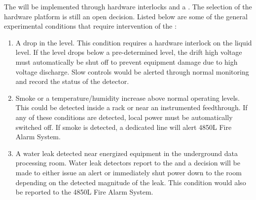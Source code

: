 The  will be implemented through hardware interlocks and a
.  The selection of the  hardware platform is still an open decision.  Listed below are some of the general  experimental conditions that require intervention of the :
\begin{enumerate}
 \item A drop in the  level.  This condition requires a hardware
   interlock on the liquid level.  If the level drops below a
   pre-determined level, the drift high voltage must automatically be 
   shut off to prevent equipment damage due to high voltage discharge.  Slow controls would be
   alerted through normal monitoring and record the status of the detector.
 \item Smoke or a temperature/humidity increase above normal operating
   levels. This could be detected inside a rack or near an instrumented
   feedthrough.  If any of these conditions are detected, local
   power must be automatically switched off. If smoke is detected, a
   dedicated line will alert 4850L Fire Alarm System.
 \item A water leak detected near energized equipment in the 
   underground data processing room.  Water leak detectors 
   report to the   and a decision will be made to either
   issue an alert or immediately shut power down to the room depending
   on the detected magnitude of the leak.  This condition would also be reported
   to the 4850L Fire Alarm System.
\end{enumerate}





